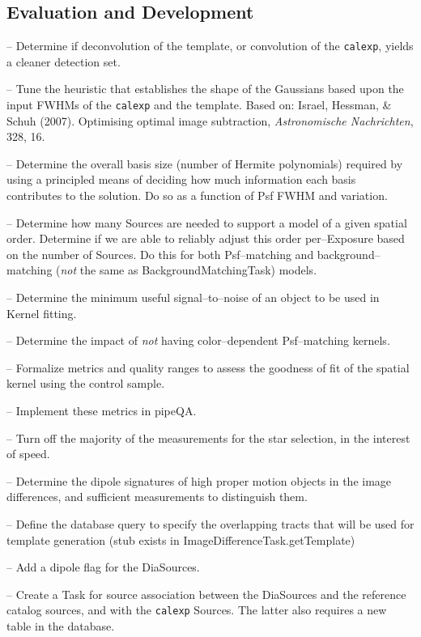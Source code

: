 \documentclass[prd, nofootinbib, floatfix, 11pt,tightenlines,times]{article}
\begin{document}
\subsection{Evaluation and Development}

-- Determine if deconvolution of the template, or convolution of the {\tt calexp},
yields a cleaner detection set.

-- Tune the heuristic that establishes the shape of the Gaussians
based upon the input FWHMs of the {\tt calexp} and the template.
Based on: {Israel}, {Hessman}, \& {Schuh} (2007).  Optimising optimal
image subtraction, {\it Astronomische Nachrichten}, 328, 16.

-- Determine the overall basis size (number of Hermite polynomials)
required by using a principled means of deciding how much information
each basis contributes to the solution.  Do so as a function of Psf
FWHM and variation.

-- Determine how many Sources are needed to support a model of a given
spatial order.  Determine if we are able to reliably adjust this order
per--Exposure based on the number of Sources.  Do this for both
Psf--matching and background--matching ({\it not} the same as
BackgroundMatchingTask) models.

-- Determine the minimum useful signal--to--noise of an object to be
used in Kernel fitting.

-- Determine the impact of {\it not} having color--dependent Psf--matching kernels.

-- Formalize metrics and quality ranges to assess the goodness of fit
of the spatial kernel using the control sample.

-- Implement these metrics in pipeQA.

-- Turn off the majority of the measurements for the star selection,
in the interest of speed.

-- Determine the dipole signatures of high proper motion objects in
the image differences, and sufficient measurements to distinguish
them.

-- Define the database query to specify the overlapping tracts that
will be used for template generation (stub exists in
ImageDifferenceTask.getTemplate)

-- Add a dipole flag for the DiaSources.

-- Create a Task for source association between the DiaSources and the
reference catalog sources, and with the {\tt calexp} Sources.  The
latter also requires a new table in the database.
\end{document}

